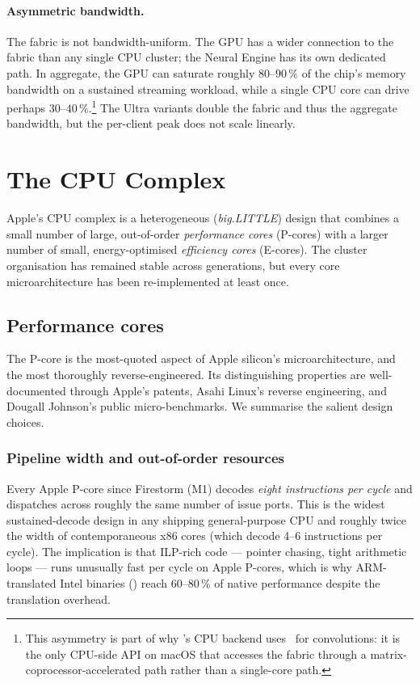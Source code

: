 \paragraph{Asymmetric bandwidth.} The fabric is not bandwidth-uniform.
The GPU has a wider connection to the fabric than any single CPU
cluster; the Neural Engine has its own dedicated path. In aggregate,
the GPU can saturate roughly $80$--$90\,\%$ of the chip's memory
bandwidth on a sustained streaming workload, while a single CPU core
can drive perhaps $30$--$40\,\%$.\footnote{This asymmetry is part of
why \Lucid's CPU backend uses \BNNS\ for convolutions: it is the only
CPU-side API on macOS that accesses the fabric through a
matrix-coprocessor-accelerated path rather than a single-core path.}
The Ultra variants double the fabric and thus the aggregate
bandwidth, but the per-client peak does not scale linearly.

\section{The CPU Complex}
\label{sec:apple_silicon:cpu}

Apple's CPU complex is a heterogeneous (\emph{big.LITTLE}) design that
combines a small number of large, out-of-order \emph{performance
cores} (P-cores) with a larger number of small, energy-optimised
\emph{efficiency cores} (E-cores). The cluster organisation has
remained stable across generations, but every core microarchitecture
has been re-implemented at least once.

\subsection{Performance cores}
\label{ssec:apple_silicon:p_cores}

The P-core is the most-quoted aspect of Apple silicon's
microarchitecture, and the most thoroughly reverse-engineered. Its
distinguishing properties are well-documented through Apple's
patents, Asahi Linux's reverse engineering, and Dougall Johnson's
public micro-benchmarks. We summarise the salient design choices.

\subsubsection{Pipeline width and out-of-order resources}

Every Apple P-core since Firestorm (M1) decodes \emph{eight
instructions per cycle} and dispatches across roughly the same number
of issue ports. This is the widest sustained-decode design in any
shipping general-purpose CPU and roughly twice the width of
contemporaneous x86 cores (which decode 4--6 instructions per cycle).
The implication is that ILP-rich code --- pointer chasing, tight
arithmetic loops --- runs unusually fast per cycle on Apple P-cores,
which is why ARM-translated Intel binaries () reach
$60$--$80\,\%$ of native performance despite the translation overhead.

